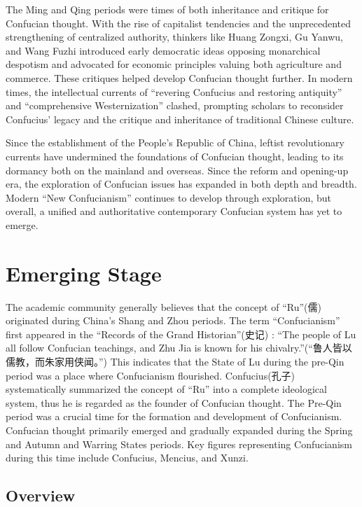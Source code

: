 \documentclass[
]{book}
\begin{document}
The Ming and Qing periods were times of both inheritance and critique for Confucian thought. With the rise of capitalist tendencies and the unprecedented strengthening of centralized authority, thinkers like Huang Zongxi, Gu Yanwu, and Wang Fuzhi introduced early democratic ideas opposing monarchical despotism and advocated for economic principles valuing both agriculture and commerce. These critiques helped develop Confucian thought further. In modern times, the intellectual currents of ``revering Confucius and restoring antiquity'' and ``comprehensive Westernization'' clashed, prompting scholars to reconsider Confucius' legacy and the critique and inheritance of traditional Chinese culture.

Since the establishment of the People's Republic of China, leftist revolutionary currents have undermined the foundations of Confucian thought, leading to its dormancy both on the mainland and overseas. Since the reform and opening-up era, the exploration of Confucian issues has expanded in both depth and breadth. Modern ``New Confucianism'' continues to develop through exploration, but overall, a unified and authoritative contemporary Confucian system has yet to emerge.

\hypertarget{emerging-stage}{%
\chapter{Emerging Stage}\label{emerging-stage}}

The academic community generally believes that the concept of ``Ru''(儒) originated during China's Shang and Zhou periods. The term ``Confucianism'' first appeared in the ``Records of the Grand Historian''(史记) : ``The people of Lu all follow Confucian teachings, and Zhu Jia is known for his chivalry.''(``鲁人皆以儒教，而朱家用侠闻。'') This indicates that the State of Lu during the pre-Qin period was a place where Confucianism flourished. Confucius(孔子) systematically summarized the concept of ``Ru'' into a complete ideological system, thus he is regarded as the founder of Confucian thought. The Pre-Qin period was a crucial time for the formation and development of Confucianism. Confucian thought primarily emerged and gradually expanded during the Spring and Autumn and Warring States periods. Key figures representing Confucianism during this time include Confucius, Mencius, and Xunzi.

\hypertarget{overview}{%
\section{Overview}\label{overview}}
\end{document}
